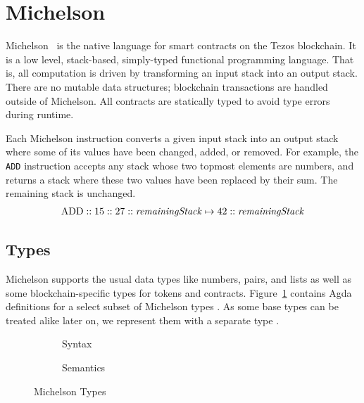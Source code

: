 \section{Michelson}
\label{sec:michelson}
\label{sec:Mtype}


Michelson~\cite{Mref,devres} is the native language for smart contracts on the Tezos blockchain.
It is a low level, stack-based, simply-typed functional programming
language. That is, all computation is driven by transforming an input
stack into an output stack. There are no mutable data structures;
blockchain transactions are handled outside of Michelson.
All contracts are statically typed to avoid type errors during runtime.

Each Michelson instruction converts a given input stack into an output stack
where some of its values have been changed, added, or removed.
For example, the \verb=ADD= instruction accepts any stack
whose two topmost elements are numbers,
and returns a stack where these two values have been replaced by their sum. The remaining stack is unchanged.
\begin{align*}
	\text{ADD} :: 15 :: 27 :: \text{\emph{remainingStack}}
	\mapsto	           42 :: \text{\emph{remainingStack}}
\label{equ:ADD}
\end{align*}

\subsection{Types}
\label{sec:michelson-types}

Michelson supports the usual data types like numbers, pairs, and lists as well as
some blockchain-specific types for tokens and contracts. 
Figure~\ref{fig:Type} contains Agda definitions for a select subset of
Michelson types {\AType}. As some base types can be treated alike later on, we
represent them with a separate type {\ABaseType}.

\begin{figure}[tp]
  \begin{subfigure}{0.48\textwidth}
    \noindent
    \TypesType
    \TypesPatterns
    \caption{Syntax}
    \label{fig:Type}
  \end{subfigure}
  \begin{subfigure}{0.48\textwidth}
  \TypesSemantics
  \caption{Semantics}
  \label{fig:Type-Semantics}
\end{subfigure}
\caption{Michelson Types}
\label{Type}
\end{figure}

